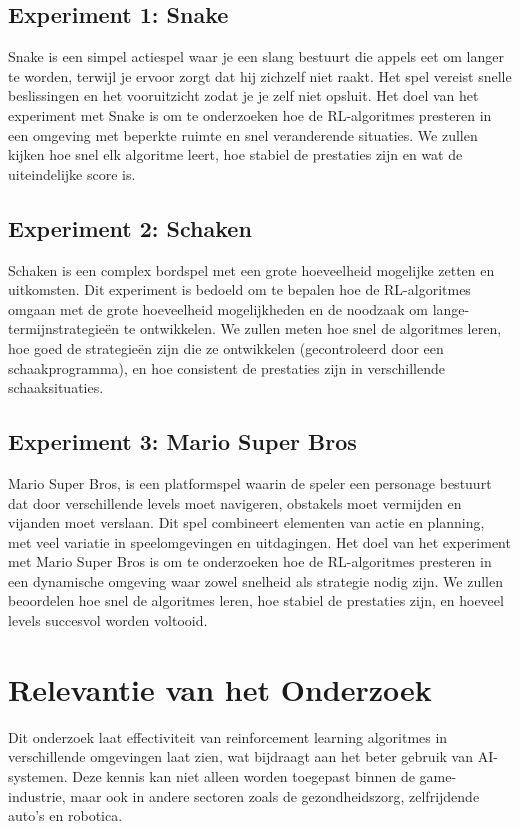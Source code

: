 \documentclass[a4paper,12pt]{article}
\begin{document}
\subsection*{Experiment 1: Snake} Snake is een simpel actiespel waar je een slang bestuurt die appels eet om
langer te worden, terwijl je ervoor zorgt dat hij zichzelf niet raakt. Het spel
vereist snelle beslissingen en het vooruitzicht zodat je je zelf niet opsluit.
Het doel van het experiment met Snake is om te onderzoeken hoe de RL-algoritmes
presteren in een omgeving met beperkte ruimte en snel veranderende situaties.
We zullen kijken hoe snel elk algoritme leert, hoe stabiel de prestaties zijn
en wat de uiteindelijke score is. \subsection*{Experiment 2: Schaken} Schaken is een complex bordspel met een grote hoeveelheid mogelijke zetten en
uitkomsten. Dit experiment is bedoeld om te bepalen hoe de RL-algoritmes omgaan
met de grote hoeveelheid mogelijkheden en de noodzaak om
lange-termijnstrategieën te ontwikkelen. We zullen meten hoe snel de algoritmes
leren, hoe goed de strategieën zijn die ze ontwikkelen (gecontroleerd door een
schaakprogramma), en hoe consistent de prestaties zijn in verschillende
schaaksituaties.

\subsection*{Experiment 3: Mario Super Bros}
Mario Super Bros, is een platformspel waarin de speler een personage bestuurt
dat door verschillende levels moet navigeren, obstakels moet vermijden en
vijanden moet verslaan. Dit spel combineert elementen van actie en planning,
met veel variatie in speelomgevingen en uitdagingen. Het doel van het
experiment met Mario Super Bros is om te onderzoeken hoe de RL-algoritmes
presteren in een dynamische omgeving waar zowel snelheid als strategie nodig
zijn. We zullen beoordelen hoe snel de algoritmes leren, hoe stabiel de
prestaties zijn, en hoeveel levels succesvol worden voltooid.

\section{Relevantie van het Onderzoek}
Dit onderzoek laat effectiviteit van reinforcement learning algoritmes in
verschillende omgevingen laat zien, wat bijdraagt aan het beter gebruik van
AI-systemen. Deze kennis kan niet alleen worden toegepast binnen de
game-industrie, maar ook in andere sectoren zoals de gezondheidszorg,
zelfrijdende auto's en robotica.
\end{document}
